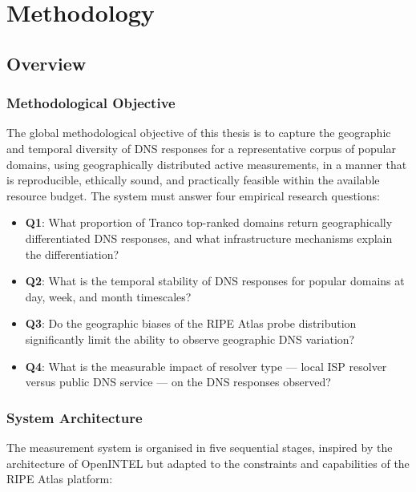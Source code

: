 \chapter{Methodology}
\label{ch:methodology}

\section{Overview}
\label{sec:3.1}

\subsection{Methodological Objective}
\label{subsec:3.1.1}

The global methodological objective of this thesis is to capture the geographic and temporal diversity of \ac{DNS} responses for a representative corpus of popular domains, using geographically distributed active measurements, in a manner that is reproducible, ethically sound, and practically feasible within the available resource budget. The system must answer four empirical research questions:

\begin{itemize}
  \item \textbf{Q1}: What proportion of Tranco top-ranked domains return geographically differentiated \ac{DNS} responses, and what infrastructure mechanisms explain the differentiation?
  \item \textbf{Q2}: What is the temporal stability of \ac{DNS} responses for popular domains at day, week, and month timescales?
  \item \textbf{Q3}: Do the geographic biases of the RIPE Atlas probe distribution significantly limit the ability to observe geographic \ac{DNS} variation?
  \item \textbf{Q4}: What is the measurable impact of resolver type --- local \ac{ISP} resolver versus public \ac{DNS} service --- on the \ac{DNS} responses observed?
\end{itemize}

\subsection{System Architecture}
\label{subsec:3.1.2}

The measurement system is organised in five sequential stages, inspired by the architecture of OpenINTEL \cite{vanRijswijk2016} but adapted to the constraints and capabilities of the RIPE Atlas platform:

